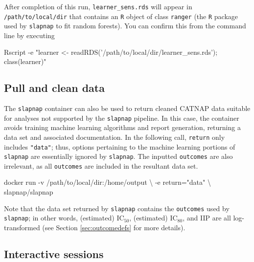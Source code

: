 \documentclass[]{article}
\newenvironment{Shaded}{\begin{snugshade}}{\end{snugshade}}
\newcommand{\StringTok}[1]{\textcolor[rgb]{0.31,0.60,0.02}{#1}}
\newcommand{\ExtensionTok}[1]{#1}
\newcommand{\NormalTok}[1]{#1}
\begin{document}
After completion of this run, \texttt{learner\_sens.rds} will appear in
\texttt{/path/to/local/dir} that contains an \texttt{R} object of class
\texttt{ranger} (the \texttt{R} package used by \texttt{slapnap} to fit
random forests). You can confirm this from the command line by executing

\begin{Shaded}
\begin{Highlighting}[]
\ExtensionTok{Rscript}\NormalTok{ -e }\StringTok{"learner <- readRDS('/path/to/local/dir/learner_sens.rds'); class(learner)"}
\end{Highlighting}
\end{Shaded}

\subsection{Pull and clean data}\label{pull-and-clean-data}

The \texttt{slapnap} container can also be used to return cleaned CATNAP
data suitable for analyses not supported by the \texttt{slapnap}
pipeline. In this case, the container avoids training machine learning
algorithms and report generation, returning a data set and associated
documentation. In the following call, \texttt{return} only includes
\texttt{"data"}; thus, options pertaining to the machine learning
portions of \texttt{slapnap} are essentially ignored by
\texttt{slapnap}. The inputted \texttt{outcomes} are also irrelevant, as
all \texttt{outcomes} are included in the resultant data set.

\begin{Shaded}
\begin{Highlighting}[]
\ExtensionTok{docker}\NormalTok{ run -v /path/to/local/dir:/home/output \textbackslash{}}
\NormalTok{           -e return=}\StringTok{"data"}\NormalTok{ \textbackslash{}}
\NormalTok{           slapnap/slapnap}
\end{Highlighting}
\end{Shaded}

Note that the data set returned by \texttt{slapnap} contains the
\texttt{outcomes} used by \texttt{slapnap}; in other words, (estimated)
IC\(_{50}\), (estimated) IC\(_{80}\), and IIP are all log-transformed
(see Section \ref{sec:outcomedefs} for more details).

\subsection{Interactive sessions}\label{interactive-sessions}
\end{document}
